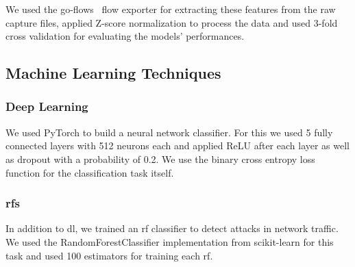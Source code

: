 \documentclass[10pt,sigconf,letterpaper,dvipsnames]{acmart}
\begin{document}
We used the go-flows~\cite{vormayr_cn-tu/go-flows_2019} flow exporter for extracting these features from the raw capture files, applied Z-score normalization to process the data and used 3-fold cross validation for evaluating the models' performances.


\subsection{Machine Learning Techniques}
\subsubsection{Deep Learning}
We used PyTorch to build a neural network classifier. For this we used 5 fully connected layers with 512 neurons each and applied ReLU after each layer as well as dropout with a probability of 0.2. We use the binary cross entropy loss function for the classification task itself.

\subsubsection{\glspl{rf}}
In addition to \gls{dl}, we trained an \gls{rf} classifier to detect attacks in network traffic. We used the RandomForestClassifier implementation from scikit-learn for this task and used 100 estimators for training each \gls{rf}.
\end{document}
